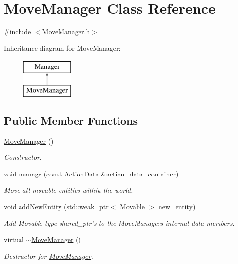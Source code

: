 \hypertarget{classMoveManager}{\section{Move\-Manager Class Reference}
\label{classMoveManager}
}


{\ttfamily \#include $<$Move\-Manager.\-h$>$}

Inheritance diagram for Move\-Manager\-:\begin{figure}[H]
\begin{center}
\leavevmode
\includegraphics[height=2.000000cm]{classMoveManager}
\end{center}
\end{figure}
\subsection*{Public Member Functions}
\begin{DoxyCompactItemize}
\item 
\hyperlink{classMoveManager_a57ac62af15a2d9f9ed9b9ae96ea7900f}{Move\-Manager} ()
\begin{DoxyCompactList}\small\item\em Constructor. \end{DoxyCompactList}\item 
void \hyperlink{classMoveManager_a1e21cd4f542f801e84b57fd5f11f1154}{manage} (const \hyperlink{classActionData}{Action\-Data} \&action\-\_\-data\-\_\-container)
\begin{DoxyCompactList}\small\item\em Move all movable entities within the world. \end{DoxyCompactList}\item 
void \hyperlink{classMoveManager_a9f49f128a880d4f94c529c6aafab880e}{add\-New\-Entity} (std\-::weak\-\_\-ptr$<$ \hyperlink{classMovable}{Movable} $>$ new\-\_\-entity)
\begin{DoxyCompactList}\small\item\em Add Movable-\/type shared\-\_\-ptr's to the Move\-Managers internal data members. \end{DoxyCompactList}\item 
virtual \hyperlink{classMoveManager_a1de20c7414d1511c5b3a58196a557d94}{$\sim$\-Move\-Manager} ()
\begin{DoxyCompactList}\small\item\em Destructor for \hyperlink{classMoveManager}{Move\-Manager}. \end{DoxyCompactList}\end{DoxyCompactItemize}
